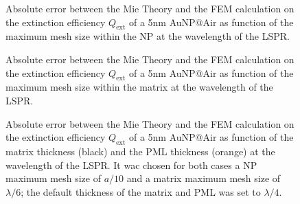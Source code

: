 %
\begin{figure}[h!]\centering
	\def\svgwidth{\textwidth} \small
{}
\vspace*{-1em}
\caption[Extinction Efficiency Absolute Error: NP Max Mesh Size Analysis]{Absolute error between the Mie Theory and the FEM calculation on the extinction efficiency $Q_\text{ext}$ of a 5nm AuNP$@$Air as function of the maximum mesh size within the NP at the wavelength of the LSPR.}
\label{fig:Eff:sphere:radius}
\end{figure}

%
\begin{figure}[h!]\centering
	\def\svgwidth{\textwidth} \small
{}
\vspace*{-1em}
\caption[Extinction Efficiency Absolute Error: Matrix Max Mesh Size Analysis]{Absolute error between the Mie Theory and the FEM calculation on the extinction efficiency $Q_\text{ext}$ of a 5nm AuNP$@$Air as function of the maximum mesh size within the matrix at the wavelength of the LSPR.}
\label{fig:Eff:sphere:matrix}
\end{figure}


\begin{figure}[h!]\centering
	\def\svgwidth{\textwidth} \small
{}
\vspace*{-1em}
\caption[Extinction Efficiency Absolute Error: Matrix and PML Thickness Analysis]{Absolute error between the Mie Theory and the FEM calculation on the extinction efficiency $Q_\text{ext}$ of a 5nm AuNP$@$Air as function of the matrix thickness (black) and the PML thickness (orange) at the wavelength of the LSPR. It wac chosen for both cases a NP maximum mesh size of $a/10$ and a matrix maximum mesh size of $\lambda/6$; the default thickness of the matrix and PML was set to $\lambda/4$.}
\label{fig:Eff:sphere:thickness}
\end{figure}








%
%
%




